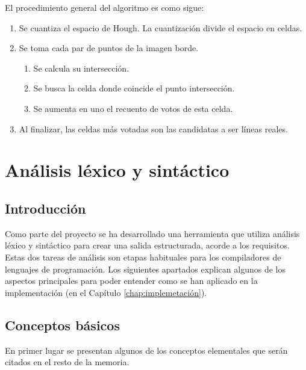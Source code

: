 El procedimiento general del algoritmo es como sigue:

\begin{enumerate}
    \item Se cuantiza el espacio de Hough. La cuantización divide el espacio en celdas.
    \item Se toma cada par de puntos de la imagen borde.
    \begin{enumerate}
        \item Se calcula su intersección.
        \item Se busca la celda donde coincide el punto intersección.
        \item Se aumenta en uno el recuento de votos de esta celda.
    \end{enumerate}
    \item Al finalizar, las celdas más votadas son las candidatas a ser líneas reales.
\end{enumerate}

\section{Análisis léxico y sintáctico}

\subsection{Introducción}

Como parte del proyecto se ha desarrollado una herramienta que utiliza análisis léxico y sintáctico para crear una salida estructurada, acorde a los requisitos. Estas dos tareas de análisis son etapas habituales para los compiladores de lenguajes de programación. Los siguientes apartados explican algunos de los aspectos principales para poder entender como se han aplicado en la implementación (en el Capítulo \ref{chap:implemetación}).

\subsection{Conceptos básicos}

En primer lugar se presentan algunos de los conceptos elementales que serán citados en el resto de la memoria.


